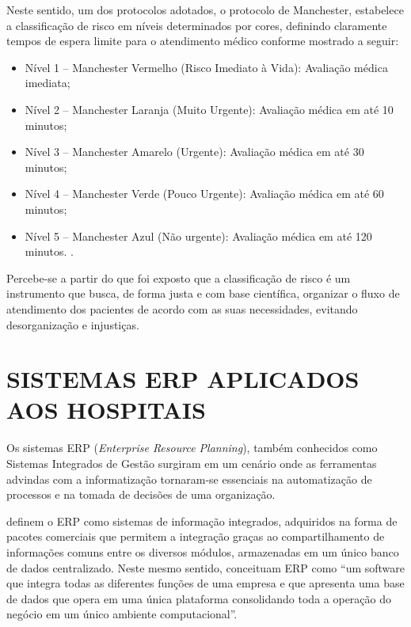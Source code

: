 Neste sentido, um dos protocolos adotados, o protocolo de Manchester, estabelece a classificação de risco em níveis determinados por cores, definindo claramente tempos de espera limite para o atendimento médico conforme mostrado a seguir:
\begin{itemize}
    \item Nível 1 – Manchester Vermelho (Risco Imediato à Vida): Avaliação médica imediata;
    
    \item Nível 2 – Manchester Laranja (Muito Urgente): Avaliação médica em até 10 minutos;
    
    \item Nível 3 – Manchester Amarelo (Urgente): Avaliação médica em até 30 minutos;
    
    \item Nível 4 – Manchester Verde (Pouco Urgente): Avaliação médica em até 60 minutos;
    
    \item Nível 5 – Manchester Azul (Não urgente): Avaliação médica em até 120 minutos. \cite[]{acolhimento}.
\end{itemize}
    
Percebe-se a partir do que foi exposto que a classificação de risco é um instrumento que busca, de forma justa e com base científica, organizar o fluxo de atendimento dos pacientes de acordo com as suas necessidades, evitando desorganização e injustiças. 

\section{SISTEMAS ERP APLICADOS AOS HOSPITAIS}

Os sistemas ERP (\textit{Enterprise Resource Planning}), também conhecidos como Sistemas Integrados de Gestão surgiram em um cenário onde as ferramentas advindas com a informatização tornaram-se essenciais na automatização de processos e na tomada de decisões de uma organização.

 definem o ERP como sistemas de informação integrados, adquiridos na forma de pacotes comerciais que permitem a integração graças ao compartilhamento de informações comuns entre os diversos módulos, armazenadas em um único banco de dados centralizado. Neste mesmo sentido,  conceituam ERP como ``um software que integra todas as diferentes funções de uma empresa e que apresenta uma base de dados que opera em uma única plataforma consolidando toda a operação do negócio em um único ambiente computacional''.


